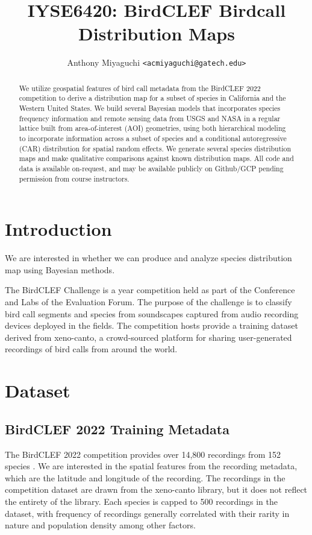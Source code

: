 \documentclass[notitlepage]{article}
\title{IYSE6420: BirdCLEF Birdcall Distribution Maps}
\author{
    Anthony Miyaguchi \texttt{<acmiyaguchi@gatech.edu>}
}
\begin{document}
\maketitle
\thispagestyle{empty}

\begin{abstract}

We utilize geospatial features of bird call metadata from the BirdCLEF 2022 competition to derive a distribution map for a subset of species in California and the Western United States.
We build several Bayesian models that incorporates species frequency information and remote sensing data from USGS and NASA in a regular lattice built from area-of-interest (AOI) geometries, using both hierarchical modeling to incorporate information across a subset of species and a conditional autoregressive (CAR) distribution for spatial random effects.
We generate several species distribution maps and make qualitative comparisons against known distribution maps.
All code and data is available on-request, and may be available publicly on Github/GCP pending permission from course instructors.

\end{abstract}

\section{Introduction}

We are interested in whether we can produce and analyze species distribution map using Bayesian methods.

The BirdCLEF Challenge is a year competition held as part of the Conference and Labs of the Evaluation Forum.
The purpose of the challenge is to classify bird call segments and species from soundscapes captured from audio recording devices deployed in the fields.
The competition hosts provide a training dataset derived from xeno-canto, a crowd-sourced platform for sharing user-generated recordings of bird calls from around the world.

\section{Dataset}
\subsection{BirdCLEF 2022 Training Metadata}

The BirdCLEF 2022 competition provides over 14,800 recordings from 152 species \cite{kahl2022overview}.
We are interested in the spatial features from the recording metadata, which are the latitude and longitude of the recording.
The recordings in the competition dataset are drawn from the xeno-canto library, but it does not reflect the entirety of the library.
Each species is capped to 500 recordings in the dataset, with frequency of recordings generally correlated with their rarity in nature and population density among other factors.
\end{document}
